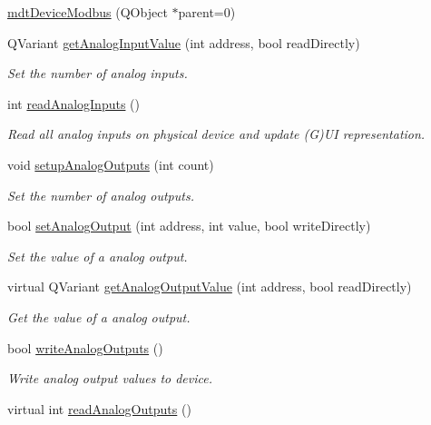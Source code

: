 \begin{DoxyCompactItemize}
\item 
\hyperlink{classmdt_device_modbus_ac69cfbe26681342ba05672ab63de2a1f}{mdtDeviceModbus} (QObject $\ast$parent=0)
\item 
QVariant \hyperlink{classmdt_device_modbus_acf9a158bc7d9847858217e44394af07e}{getAnalogInputValue} (int address, bool readDirectly)
\begin{DoxyCompactList}\small\item\em Set the number of analog inputs. \end{DoxyCompactList}\item 
int \hyperlink{classmdt_device_modbus_a4bf4c1d87f6b61955a015234a928e864}{readAnalogInputs} ()
\begin{DoxyCompactList}\small\item\em Read all analog inputs on physical device and update (G)UI representation. \end{DoxyCompactList}\item 
void \hyperlink{classmdt_device_modbus_a233f0167ca1b728f9d47ebc4f597e2d1}{setupAnalogOutputs} (int count)
\begin{DoxyCompactList}\small\item\em Set the number of analog outputs. \end{DoxyCompactList}\item 
bool \hyperlink{classmdt_device_modbus_a5a8f605ef4c14907cef354daac90b180}{setAnalogOutput} (int address, int value, bool writeDirectly)
\begin{DoxyCompactList}\small\item\em Set the value of a analog output. \end{DoxyCompactList}\item 
virtual QVariant \hyperlink{classmdt_device_modbus_ae5b1fe86e7dca9a0229110ba81830648}{getAnalogOutputValue} (int address, bool readDirectly)
\begin{DoxyCompactList}\small\item\em Get the value of a analog output. \end{DoxyCompactList}\item 
bool \hyperlink{classmdt_device_modbus_aea63bdcba6d3acfce5eb28524b0dc6d2}{writeAnalogOutputs} ()
\begin{DoxyCompactList}\small\item\em Write analog output values to device. \end{DoxyCompactList}\item 
virtual int \hyperlink{classmdt_device_modbus_a28aab79bc878490fa6bf624ddee4b62a}{readAnalogOutputs} ()

\end{DoxyCompactItemize}
